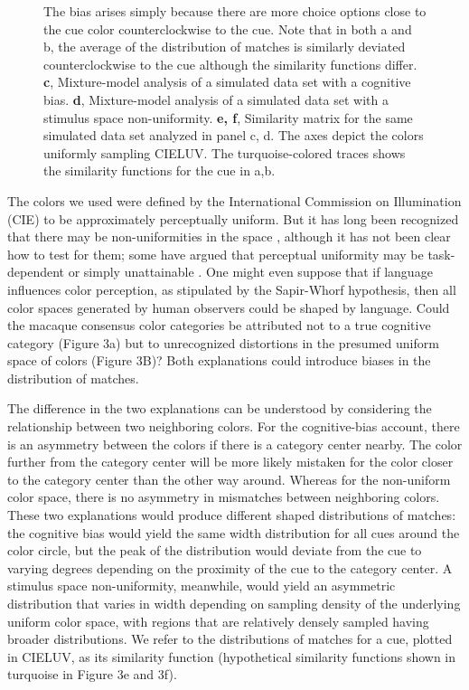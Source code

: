 \begin{figure}
\begin{fullwidth}
{	The bias arises simply because there are more choice options close to the cue color counterclockwise to the cue. 
	Note that in both a and b, the average of the distribution of matches is similarly deviated counterclockwise to the cue although the similarity functions differ. 
	\textbf{c}, Mixture-model analysis of a simulated data set with a cognitive bias. 
	\textbf{d}, Mixture-model analysis of a simulated data set with a stimulus space non-uniformity. 
	\textbf{e, f}, Similarity matrix for the same simulated data set analyzed in panel c, d. The axes depict the colors uniformly sampling CIELUV. The turquoise-colored traces shows the similarity functions for the cue in a,b.}
    \label{fig:TCCDemo}
    \end{fullwidth}
\end{figure}

The colors we used were defined by the International Commission on Illumination (CIE) to be approximately perceptually uniform. 
But it has long been recognized that there may be non-uniformities in the space \citep{stockman_colorimetry_2010}, although it has not been clear how to test for them; some have argued that perceptual uniformity may be task-dependent or simply unattainable \citep{judd_ideal_1969}. One might even suppose that if language influences color perception, as stipulated by the Sapir-Whorf hypothesis, then all color spaces generated by human observers could be shaped by language. Could the macaque consensus color categories be attributed not to a true cognitive category (Figure 3a) but to unrecognized distortions in the presumed uniform space of colors (Figure 3B)?
Both explanations could introduce biases in the distribution of matches.

The difference in the two explanations can be understood by considering the relationship between two neighboring colors. 
For the cognitive-bias account, there is an asymmetry between the colors if there is a category center nearby.
The color further from the category center will be more likely mistaken for the color closer to the category center than the other way around. 
Whereas for the non-uniform color space, there is no asymmetry in mismatches between neighboring colors. 
These two explanations would produce different shaped distributions of matches: the cognitive bias would yield the same width distribution for all cues around the color circle, but the peak of the distribution would deviate from the cue to varying degrees depending on the proximity of the cue to the category center. 
A stimulus space non-uniformity, meanwhile, would yield an asymmetric distribution that varies in width depending on sampling density of the underlying uniform color space, with regions that are relatively densely sampled having broader distributions. 
We refer to the distributions of matches for a cue, plotted in CIELUV, as its similarity function (hypothetical similarity functions shown in turquoise in Figure 3e and 3f).

